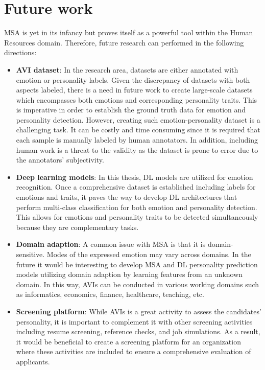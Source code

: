\section{Future work}
\label{sec:future_work}
MSA is yet in its infancy but proves itself as a powerful tool within the Human Resources domain. Therefore, future research can performed in the following directions:
\begin{itemize}
    \item \textbf{AVI dataset}: In the research area, datasets are either annotated with emotion or personality labels. Given the discrepancy of datasets with both aspects labeled, there is a need in future work to create large-scale datasets which encompasses both emotions and corresponding personality traits. This is imperative in order to establish the ground truth data for emotion and personality detection. However, creating such emotion-personality dataset is a challenging task. It can be costly and time consuming since it is required that each sample is manually labeled by human annotators. In addition, including human work is a threat to the validity as the dataset is prone to error due to the annotators' subjectivity. \\ 
    \item \textbf{Deep learning models}: In this thesis, DL models are utilized for emotion recognition. Once a comprehensive dataset is established including labels for emotions and traits, it paves the way to develop DL architectures that perform multi-class classification for both emotion and personality detection. This allows for emotions and personality traits to be detected simultaneously because they are complementary tasks. \\
    \item \textbf{Domain adaption}: A common issue with MSA is that it is domain-sensitive. Modes of the expressed emotion may vary across domains. In the future it would be interesting to develop MSA and DL personality prediction models utilizing domain adaption by learning features from an unknown domain. In this way, AVIs can be conducted in various working domains such as informatics, economics, finance, healthcare, teaching, etc. \\
    \item  \textbf{Screening platform}: While AVIs is a great activity to assess the candidates' personality, it is important to complement it with other screening activities including resume screening, reference checks, and job simulations. As a result, it would be beneficial to create a screening platform for an organization where these activities are included to ensure a comprehensive evaluation of applicants. 
\end{itemize}



